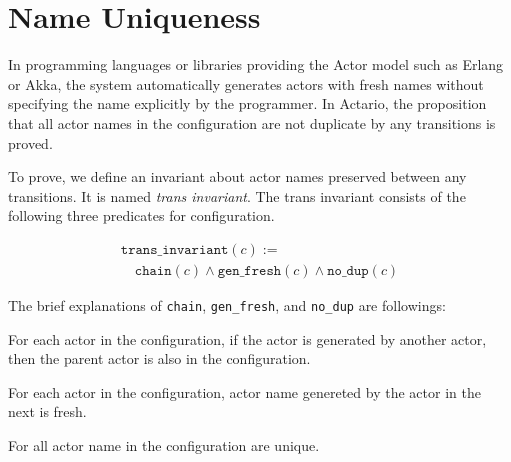 \section{Name Uniqueness}
\label{sec:uniqueness}
In programming languages or libraries providing the Actor model such as Erlang or Akka,
the system automatically generates actors with fresh names without specifying the name explicitly by the programmer.
In Actario, the proposition that all actor names in the configuration are not duplicate by any transitions is proved.


To prove, we define an invariant about actor names preserved between any transitions. It is named \textit{trans invariant}.
The trans invariant consists of the following three predicates for configuration.

\begin{displaymath}
  \begin{array}{l}
    \texttt{trans\_invariant}(c) := \\
    \quad \texttt{chain}(c) \wedge \texttt{gen\_fresh}(c) \wedge \texttt{no\_dup}(c)
  \end{array}
\end{displaymath}

The brief explanations of \texttt{chain}, \texttt{gen\_fresh}, and \texttt{no\_dup} are followings:

\begin{description}[style=nextline,leftmargin=12pt,parsep=0pt]
\item[\texttt{chain}]
  For each actor in the configuration, if the actor is generated by another actor, then the parent actor is also in the configuration.
\item[\texttt{gen\_fresh}]
  For each actor in the configuration, actor name genereted by the actor in the next is fresh.
\item[\texttt{no\_dup}]
  For all actor name in the configuration are unique.
\end{description}

